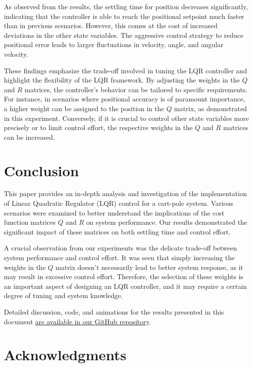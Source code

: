 \documentclass[11pt,twocolumn,twoside,lineno]{pnas-new}
\begin{document}
As observed from the results, the settling time for position decreases significantly, indicating that the controller is able to reach the positional setpoint much faster than in previous scenarios. However, this comes at the cost of increased deviations in the other state variables. The aggressive control strategy to reduce positional error leads to larger fluctuations in velocity, angle, and angular velocity.

These findings emphasize the trade-off involved in tuning the LQR controller and highlight the flexibility of the LQR framework. By adjusting the weights in the $Q$ and $R$ matrices, the controller's behavior can be tailored to specific requirements. For instance, in scenarios where positional accuracy is of paramount importance, a higher weight can be assigned to the position in the $Q$ matrix, as demonstrated in this experiment. Conversely, if it is crucial to control other state variables more precisely or to limit control effort, the respective weights in the $Q$ and $R$ matrices can be increased.

\section{Conclusion}

This paper provides an in-depth analysis and investigation of the implementation of Linear Quadratic Regulator (LQR) control for a cart-pole system. Various scenarios were examined to better understand the implications of the cost function matrices $Q$ and $R$ on system performance. Our results demonstrated the significant impact of these matrices on both settling time and control effort.

A crucial observation from our experiments was the delicate trade-off between system performance and control effort. It was seen that simply increasing the weights in the $Q$ matrix doesn't necessarily lead to better system response, as it may result in excessive control effort. Therefore, the selection of these weights is an important aspect of designing an LQR controller, and it may require a certain degree of tuning and system knowledge.

Detailed discussion, code, and animations for the results presented in this document \href{https://github.com/sezer-muhammed/LQR-Controller-Examples}{are available in our GitHub repository}. 



\showmatmethods{} %
\section{Acknowledgments}
\end{document}
